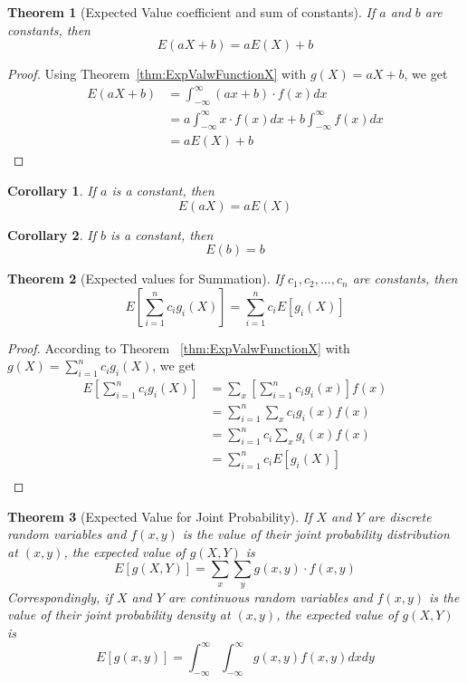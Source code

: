 \documentclass[
10pt,reqno
]{amsart}
\newtheorem{theorem}{Theorem}[section]
\newtheorem{corollary}{Corollary}[section]
\theoremstyle{definition}
\begin{document}
\begin{theorem}[Expected Value coefficient and sum of constants]
If \(a\) and \(b\) are constants, then 
\[
E(aX + b)=aE(X)+b
\]
\end{theorem}

\begin{proof}
Using Theorem~\ref{thm:ExpValwFunctionX} with \(g(X)=aX+b\), we get
\begin{align*}
E(aX+b)&=\int_{-\infty}^{\infty}(ax+b) \cdot f(x) dx\\
&=a \int_{-\infty}^{\infty}x \cdot f(x)dx+b \int_{-\infty}^{\infty}f(x)dx\\
&=aE(X)+b
\end{align*}
\end{proof}

\begin{corollary}
If \(a\) is a constant, then
\[
E(aX)=aE(X)
\]
\end{corollary}

\begin{corollary}
If \(b\) is a constant, then
\[
E(b)=b
\]
\end{corollary}

\begin{theorem}[Expected values for Summation]
If \(c_1, c_2, \ldots , c_n\) are constants, then 
\[
E \left [ \sum_{i=1}^n c_i g_i(X) \right ] = \sum_{i=1}^n c_i E[g_i(X)]
\]
\end{theorem}

\begin{proof}
According to Theorem ~\ref{thm:ExpValwFunctionX} with \(g(X)=\sum_{i=1}^{n} c_i g_i (X)\), we get
\begin{align*}
E \left [ \sum_{i=1}^n c_i g_i(X) \right ] &= \sum_x \left [ \sum_{i=1}^n c_i g_i(x) \right ] f(x)\\
&= \sum_{i=1}^n \sum_x c_i g_i(x)f(x)\\
&= \sum_{i=1}^n c_i \sum_x g_i(x)f(x)\\
&= \sum_{i=1}^n c_i E[g_i(X) ] \\
\end{align*}
\end{proof}

\begin{theorem}[Expected Value for Joint Probability]
If \(X\) and \(Y\) are discrete random variables and \(f(x,y)\) is the value of their joint probability distribution at \((x,y)\), the expected value of \(g(X,Y)\) is
\[
E[g(X,Y)] = \sum_x \sum_y g(x,y) \cdot f(x,y)
\]
Correspondingly, if \(X\) and \(Y\) are continuous random variables and \(f(x,y)\) is the value of their joint probability density at \((x,y)\), the expected value of \(g(X,Y)\) is
\[
E[g(x,y)] = \int_{-\infty}^{\infty} \int_{-\infty}^{\infty} g(x,y) f(x,y) dx dy
\]
\end{theorem}
\end{document}
